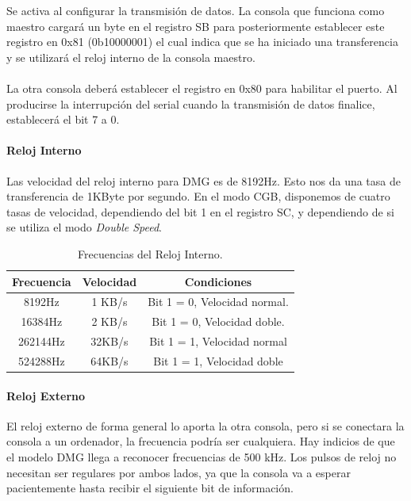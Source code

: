 Se activa al configurar la transmisión de datos. La consola que funciona como maestro cargará un byte en el registro SB para posteriormente establecer este registro en 0x81 (0b10000001) el cual indica que se ha iniciado una transferencia y se utilizará el reloj interno de la consola maestro.
\\\\
La otra consola deberá establecer el registro en 0x80 para habilitar el puerto. Al producirse la interrupción del serial cuando la transmisión de datos finalice, establecerá el bit 7 a 0.

\paragraph{Reloj Interno}

Las velocidad del reloj interno para DMG es de 8192Hz. Esto nos da una tasa de transferencia de 1KByte por segundo. En el modo CGB, disponemos de cuatro tasas de velocidad, dependiendo del bit 1 en el registro SC, y dependiendo de si se utiliza el modo \textit{Double Speed}.

\begin{table}[h!]
    \centering
    \begin{tabular}{|c|c|c|}
        \hline
        \textbf{Frecuencia} & \textbf{Velocidad} & \textbf{Condiciones} \\ \hline
        8192Hz & 1 KB/s & Bit 1 = 0, Velocidad normal. \\ \hline
        16384Hz & 2 KB/s & Bit 1 = 0, Velocidad doble. \\ \hline
        262144Hz & 32KB/s & Bit 1 = 1, Velocidad normal \\ \hline
        524288Hz & 64KB/s & Bit 1 = 1, Velocidad doble \\ \hline
    \end{tabular}
    \caption{Frecuencias del Reloj Interno.}
\end{table}

\paragraph{Reloj Externo}

El reloj externo de forma general lo aporta la otra consola, pero si se conectara la consola a un ordenador, la frecuencia podría ser cualquiera. Hay indicios de que el modelo DMG llega a reconocer frecuencias de 500 kHz. Los pulsos de reloj no necesitan ser regulares por ambos lados, ya que la consola va a esperar pacientemente hasta recibir el siguiente bit de información.

